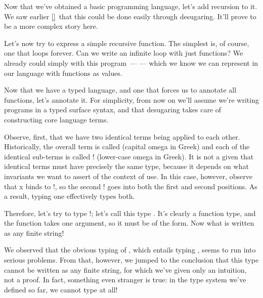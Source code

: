 
Now that we’ve obtained a basic programming language, let’s add recursion to it.
We saw earlier \ref{}\ that this could be done easily through desugaring. It’ll
prove to be a more complex story here.

\secdown
{}

Let’s now try to express a simple recursive function. The simplest is, of
course, one that loops forever. Can we write an infinite loop with just
functions? We already could simply with this program\ ---
--- which we know we can represent in our language with functions as values.


Now that we have a typed language, and one that forces us to annotate all
functions, let’s annotate it. For simplicity, from now on we’ll assume we’re
writing programs in a typed surface syntax, and that desugaring takes care of
constructing core language terms.

Observe, first, that we have two identical terms being applied to each other.
Historically, the overall term is called (capital omega in Greek) and each of
the identical sub-terms is called ! (lower-case omega in Greek). It is not a
given that identical terms must have precisely the same type, because it depends
on what invariants we want to assert of the context of use. In this case,
however, observe that x binds to !, so the second ! goes into both the first and
second positions. As a result, typing one effectively types both.

Therefore, let’s try to type !; let’s call this type 
. It’s clearly a function type, and
the function takes one argument, so it must be of the form. Now what is
written as any finite string!



We observed that the obvious typing of , which entails typing , seems to run
into serious problems. From that, however, we jumped to the conclusion that this
type cannot be written as any finite string, for which we’ve given only an
intuition, not a proof. In fact, something even stranger is true: in the type
system we’ve defined so far, we cannot type at all!
 
